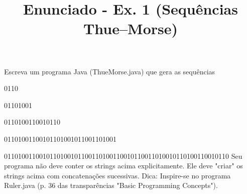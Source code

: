 \documentclass{article}
\title{Enunciado - Ex. 1 (Sequências Thue--Morse)}
\date{}
\author{}
\begin{document}
\maketitle

Escreva um programa Java (ThueMorse.java) que gera as sequ\^encias

0110

01101001

0110100110010110

01101001100101101001011001101001

0110100110010110100101100110100110010110011010010110100110010110
\bigbreak
Seu programa n\~ao deve conter os strings acima explicitamente. Ele deve "criar" os strings acima com concatena\c{c}\~oes sucessivas.
\bigbreak
Dica: Inspire-se no programa Ruler.java (p. 36 das transpar\^encias "Basic Programming Concepts").
\end{document}
